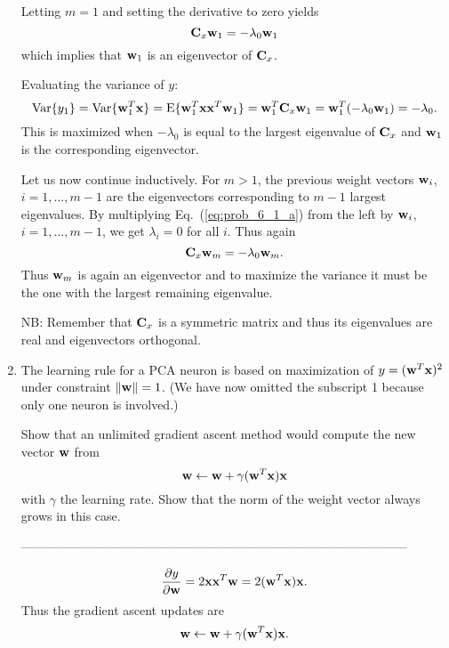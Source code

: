 \documentclass[10pt]{article}
\begin{document}
\begin{enumerate}
Letting $m=1$ and setting the derivative to zero yields
\begin{equation}
  \mathbf{C}_x \mathbf{w}_1 = - \lambda_0 \mathbf{w}_1
\end{equation}
which implies that $\mathbf{w}_1$ is an eigenvector of $\mathbf{C}_x$.

Evaluating the variance of $y$:
\begin{equation}
  \operatorname{Var}\{ y_1 \} = \operatorname{Var}\{ \mathbf{w}_1^T \mathbf{x} \} = \operatorname{E}\{ \mathbf{w}_1^T \mathbf{x} \mathbf{x}^T \mathbf{w}_1 \}
    = \mathbf{w}_1^T \mathbf{C}_x \mathbf{w}_1 = \mathbf{w}_1^T (- \lambda_0 \mathbf{w}_1) = - \lambda_0.
\end{equation}
This is maximized when $- \lambda_0$ is equal to the largest
eigenvalue of $\mathbf{C}_x$ and $\mathbf{w}_1$ is the corresponding eigenvector.

Let us now continue inductively.  For $m>1$, the previous weight
vectors $\mathbf{w}_i$, $i = 1, \dots, m-1$ are the eigenvectors
corresponding to $m-1$ largest eigenvalues.  By multiplying
Eq.~(\ref{eq:prob_6_1_a}) from the left by $\mathbf{w}_i$, $i = 1, \dots,
m-1$, we get $\lambda_i = 0$ for all $i$.  Thus again
\begin{equation}
  \mathbf{C}_x \mathbf{w}_m = - \lambda_0 \mathbf{w}_m.
\end{equation}
Thus $\mathbf{w}_m$ is again an eigenvector and to maximize the variance it
must be the one with the largest remaining eigenvalue.

NB: Remember that $\mathbf{C}_x$ is a symmetric matrix and thus its
eigenvalues are real and eigenvectors orthogonal.




\vspace{2mm}

\vspace{2cm}
\item The learning rule for a PCA neuron is based on maximization of
  $y=({\bf w}^T{\bf x})^2$ under constraint $ \| {\bf w} \| = 1$. (We have now omitted the
  subscript 1 because only one neuron is involved.)

Show that an unlimited gradient ascent method would compute the new
vector ${\bf w}$ from
\[
{\bf w} \leftarrow {\bf w} + \gamma ({\bf w}^T{\bf x}){\bf x}
\]
with $\gamma$ the learning rate. Show that the norm of the weight
vector always grows in this case.

---------------------------------------------------------------------------------------------


\begin{equation}
  \frac{\partial y}{\partial \mathbf{w}} = 2 \mathbf{x} \mathbf{x}^T \mathbf{w} = 2 (\mathbf{w}^T \mathbf{x}) \mathbf{x}.
\end{equation}
Thus the gradient ascent updates are
\begin{equation}
  \mathbf{w} \leftarrow \mathbf{w} + \gamma (\mathbf{w}^T \mathbf{x}) \mathbf{x}.
\end{equation}


\end{enumerate}
\end{document}
